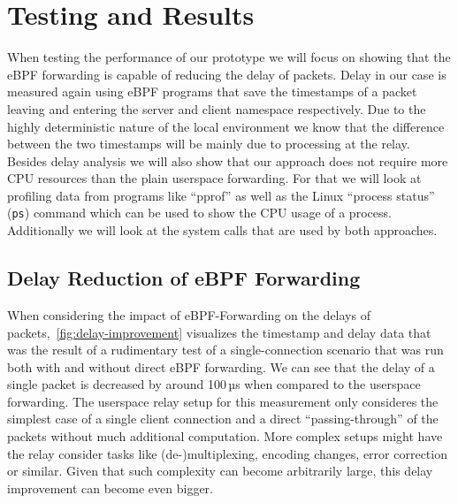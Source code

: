 \section{Testing and Results}\label{sec:testing_and_results}
When testing the performance of our prototype we will focus on showing that the eBPF forwarding
is capable of reducing the delay of packets.
Delay in our case is measured again using eBPF programs that save the timestamps of a packet 
leaving and entering the server and client namespace respectively.
Due to the highly deterministic nature of the local environment we know that the difference 
between the two timestamps will be mainly due to processing at the relay.
Besides delay analysis we will also show that our approach does not require more CPU resources
than the plain userspace forwarding.
For that we will look at profiling data from programs like ``pprof'' %
as well as the Linux ``process status'' (\verb|ps|) command which can be used to 
show the CPU usage of a process. %
Additionally we will look at the system calls that are used by both approaches.

\subsection{Delay Reduction of eBPF Forwarding}
When considering the impact of eBPF-Forwarding on the delays of packets,~\autoref{fig:delay-improvement}
visualizes the timestamp and delay data that was the result of a rudimentary test of a single-connection 
scenario that was run both with and without direct eBPF forwarding.
We can see that the delay of a single packet is decreased by around 100\,µs
when compared to the userspace forwarding. 
The userspace relay setup for this measurement only consideres the simplest case of a single client connection 
and a direct ``passing-through'' of the packets without much additional computation.
More complex setups might have the relay consider tasks like (de-)multiplexing, 
encoding changes, error correction or similar. 
Given that such complexity can become arbitrarily large, this delay improvement can become even bigger.

